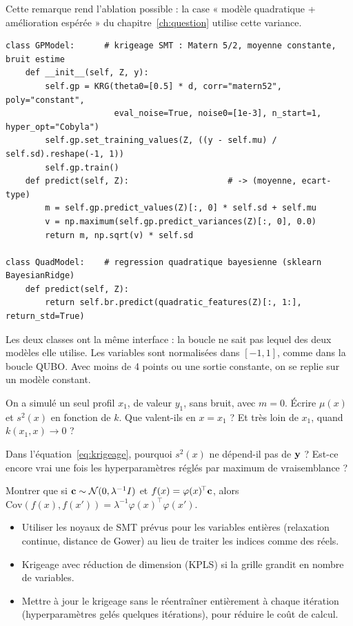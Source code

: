Cette remarque rend l'ablation possible : la case « modèle quadratique + amélioration espérée » du chapitre~\ref{ch:question} utilise cette variance.

\begin{codebox}
\begin{lstlisting}
class GPModel:      # krigeage SMT : Matern 5/2, moyenne constante, bruit estime
    def __init__(self, Z, y):
        self.gp = KRG(theta0=[0.5] * d, corr="matern52", poly="constant",
                      eval_noise=True, noise0=[1e-3], n_start=1, hyper_opt="Cobyla")
        self.gp.set_training_values(Z, ((y - self.mu) / self.sd).reshape(-1, 1))
        self.gp.train()
    def predict(self, Z):                    # -> (moyenne, ecart-type)
        m = self.gp.predict_values(Z)[:, 0] * self.sd + self.mu
        v = np.maximum(self.gp.predict_variances(Z)[:, 0], 0.0)
        return m, np.sqrt(v) * self.sd

class QuadModel:    # regression quadratique bayesienne (sklearn BayesianRidge)
    def predict(self, Z):
        return self.br.predict(quadratic_features(Z)[:, 1:], return_std=True)
\end{lstlisting}
Les deux classes ont la même interface : la boucle ne sait pas lequel des deux modèles elle utilise. Les variables sont normalisées dans $[-1,1]$, comme dans la boucle QUBO. Avec moins de 4 points ou une sortie constante, on se replie sur un modèle constant.
\end{codebox}

\exercices
\begin{exercice}
On a simulé un seul profil $x_1$, de valeur $y_1$, sans bruit, avec $m=0$. Écrire $\mu(x)$ et $s^2(x)$ en fonction de $k$. Que valent-ils en $x=x_1$ ? Et très loin de $x_1$, quand $k(x_1,x)\to0$ ?
\end{exercice}
\begin{exercice}
Dans l'équation~\eqref{eq:krigeage}, pourquoi $s^2(x)$ ne dépend-il pas de $\mathbf{y}$ ? Est-ce encore vrai une fois les hyperparamètres réglés par maximum de vraisemblance ?
\end{exercice}
\begin{exercice}
Montrer que si $\mathbf{c}\sim\mathcal N(0,\lambda^{-1}I)$ et $f(x)=\varphi(x)^{\!\top}\mathbf{c}$, alors $\mathrm{Cov}(f(x),f(x'))=\lambda^{-1}\varphi(x)^{\!\top}\varphi(x')$.
\end{exercice}

\begin{pistes}
\begin{itemize}
\item Utiliser les noyaux de SMT prévus pour les variables entières (relaxation continue, distance de Gower) au lieu de traiter les indices comme des réels.
\item Krigeage avec réduction de dimension (KPLS) si la grille grandit en nombre de variables.
\item Mettre à jour le krigeage sans le réentraîner entièrement à chaque itération (hyperparamètres gelés quelques itérations), pour réduire le coût de calcul.
\end{itemize}
\end{pistes}
